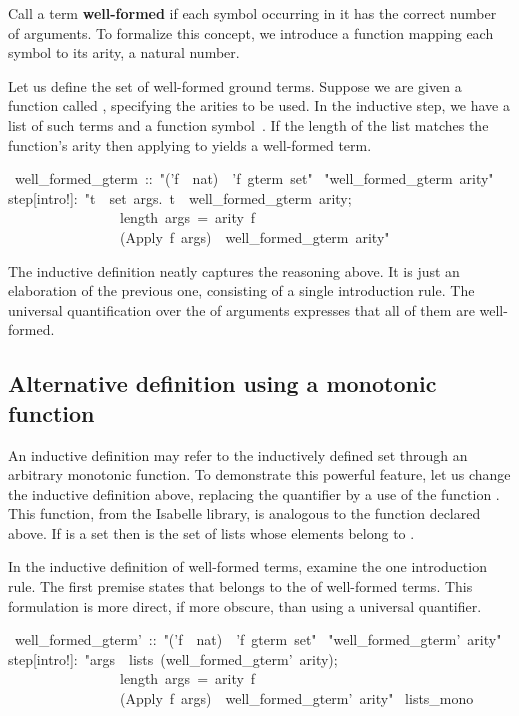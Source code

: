 Call a term \textbf{well-formed} if each symbol occurring in it has 
the correct number of arguments. To formalize this concept, we 
introduce a function mapping each symbol to its arity, a natural 
number. 

Let us define the set of well-formed ground terms. 
Suppose we are given a function called , specifying the arities to be used.
In the inductive step, we have a list  of such terms and a function 
symbol~. If the length of the list matches the function's arity 
then applying  to  yields a well-formed term. 
\begin{isabelle}
\ well_formed_gterm\ ::\ "('f\ \isasymRightarrow \ nat)\ \isasymRightarrow \ 'f\ gterm\ set"\isanewline
{}\ "well_formed_gterm\ arity"\isanewline
{}\isanewline
step[intro!]:\ "\isasymlbrakk \isasymforall t\ \isasymin \ set\ args.\ t\ \isasymin \ well_formed_gterm\ arity;\ \ \isanewline
\ \ \ \ \ \ \ \ \ \ \ \ \ \ \ \ length\ args\ =\ arity\ f\isasymrbrakk \isanewline
\ \ \ \ \ \ \ \ \ \ \ \ \ \ \ \isasymLongrightarrow \ (Apply\ f\ args)\ \isasymin \ well_formed_gterm\
arity"
\end{isabelle}
%
The inductive definition neatly captures the reasoning above.
It is just an elaboration of the previous one, consisting of a single 
introduction rule. The universal quantification over the
 of arguments expresses that all of them are well-formed.

\subsection{Alternative definition using a monotonic function}

An inductive definition may refer to the inductively defined 
set through an arbitrary monotonic function.  To demonstrate this
powerful feature, let us
change the  inductive definition above, replacing the
quantifier by a use of the function . This
function, from the Isabelle library, is analogous to the
function  declared above. If  is a set then
{} is the set of lists whose elements belong to
\isa{A}.  

In the inductive definition of well-formed terms, examine the one
introduction rule.  The first premise states that \isa{args} belongs to
the \isa{lists} of well-formed terms.  This formulation is more
direct, if more obscure, than using a universal quantifier.
\begin{isabelle}
\ well_formed_gterm'\ ::\ "('f\ \isasymRightarrow \ nat)\ \isasymRightarrow \ 'f\ gterm\ set"\isanewline
\isacommand{inductive}\ "well_formed_gterm'\ arity"\isanewline
{}\isanewline
step[intro!]:\ "\isasymlbrakk args\ \isasymin \ lists\ (well_formed_gterm'\ arity);\ \ \isanewline
\ \ \ \ \ \ \ \ \ \ \ \ \ \ \ \ length\ args\ =\ arity\ f\isasymrbrakk \isanewline
\ \ \ \ \ \ \ \ \ \ \ \ \ \ \ \isasymLongrightarrow \ (Apply\ f\ args)\ \isasymin \ well_formed_gterm'\ arity"\isanewline
\isakeyword{monos}\ lists_mono
\end{isabelle}

